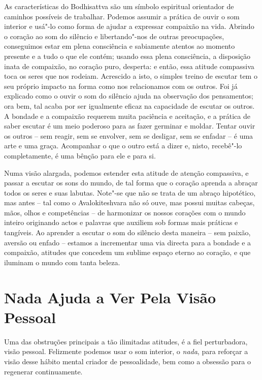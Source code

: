 As características do Bodhisattva são um símbolo espiritual orientador
de caminhos possíveis de trabalhar. Podemos assumir a prática de ouvir o
som interior e usá"-lo como forma de ajudar a expressar compaixão na
vida. Abrindo o coração ao som do silêncio e libertando"-nos de outras
preocupações, conseguimos estar em plena consciência e sabiamente
atentos ao momento presente e a tudo o que ele contém; usando essa plena
consciência, a disposição inata de compaixão, no coração puro, desperta:
e então, essa atitude compassiva toca os seres que nos rodeiam.
Acrescido a isto, o simples treino de escutar tem o seu próprio impacto
na forma como nos relacionamos com os outros. Foi já explicado como o
ouvir o som do silêncio ajuda na observação dos pensamentos; ora bem,
tal acaba por ser igualmente eficaz na capacidade de escutar os outros.
A bondade e a compaixão requerem muita paciência e aceitação, e a
prática de saber escutar é um meio poderoso para as fazer germinar e
moldar. Tentar ouvir os outros -- sem reagir, sem se envolver, sem se
desligar, sem se enfadar -- é uma arte e uma graça. Acompanhar o que o
outro está a dizer e, nisto, recebê"-lo completamente, é uma bênção para
ele e para si.

Numa visão alargada, podemos estender esta atitude de atenção
compassiva, e passar a escutar os sons do mundo, de tal forma que o
coração aprenda a abraçar todos os seres e suas labutas. Note"-se que não
se trata de um abraço hipotético, mas antes -- tal como o
Avalokiteshvara não só ouve, mas possui muitas cabeças, mãos, olhos e
competências -- de harmonizar os nossos corações com o mundo inteiro
originando actos e palavras que auxiliem sob formas mais práticas e
tangíveis. Ao aprender a escutar o som do silêncio desta maneira -- sem
paixão, aversão ou enfado -- estamos a incrementar uma via directa para
a bondade e a compaixão, atitudes que concedem um sublime espaço eterno
ao coração, e que iluminam o mundo com tanta beleza.

\section{Nada Ajuda a Ver Pela Visão Pessoal}

Uma das obstruções principais a tão ilimitadas atitudes, é a fiel
perturbadora, visão pessoal. Felizmente podemos usar o som interior, o
\emph{nada}, para reforçar a visão desse hábito mental criador de
pessoalidade, bem como a obsessão para o regenerar continuamente.


